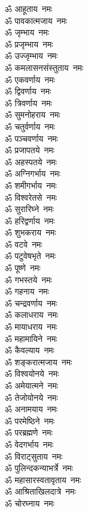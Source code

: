 \begin{multicols}{2}
\begin{flushleft}
ॐ आहूताय~नमः\hfill{}\\
ॐ पावकात्मजाय~नमः\\
ॐ जृम्भाय~नमः\\
ॐ प्रजृम्भाय~नमः\\
ॐ उज्जृम्भाय~नमः\\
ॐ कमलासनसंस्तुताय~नमः\\
ॐ एकवर्णाय~नमः\\
ॐ द्विवर्णाय~नमः\\
ॐ त्रिवर्णाय~नमः\\
ॐ सुमनोहराय~नमः\\
ॐ चतुर्वर्णाय~नमः\hfill{}\\
ॐ पञ्चवर्णाय~नमः\\
ॐ प्रजापतये~नमः\\
ॐ अहस्पतये~नमः\\
ॐ अग्निगर्भाय~नमः\\
ॐ शमीगर्भाय~नमः\\
ॐ विश्वरेतसे~नमः\\
ॐ सुरारिघ्ने~नमः\\
ॐ हरिद्वर्णाय~नमः\\
ॐ शुभकराय~नमः\\
ॐ वटवे~नमः\hfill{}\\
ॐ पटुवेषभृते~नमः\\
ॐ पूष्णे~नमः\\
ॐ गभस्तये~नमः\\
ॐ गहनाय~नमः\\
ॐ चन्द्रवर्णाय~नमः\\
ॐ कलाधराय~नमः\\
ॐ मायाधराय~नमः\\
ॐ महामायिने~नमः\\
ॐ कैवल्याय~नमः\\
ॐ शङ्करात्मजाय~नमः\hfill{}\\
ॐ विश्वयोनये~नमः\\
ॐ अमेयात्मने~नमः\\
ॐ तेजोयोनये~नमः\\
ॐ अनामयाय~नमः\\
ॐ परमेष्ठिने~नमः\\
ॐ परब्रह्मणे~नमः\\
ॐ वेदगर्भाय~नमः\\
ॐ विराट्सुताय~नमः\\
ॐ पुलिन्दकन्याभर्त्रे~नमः\\
ॐ महासारस्वतावृताय~नमः\hfill{}\\
ॐ आश्रिताखिलदात्रे~नमः\\
ॐ चोरघ्नाय~नमः\\

\end{flushleft}
\end{multicols}

